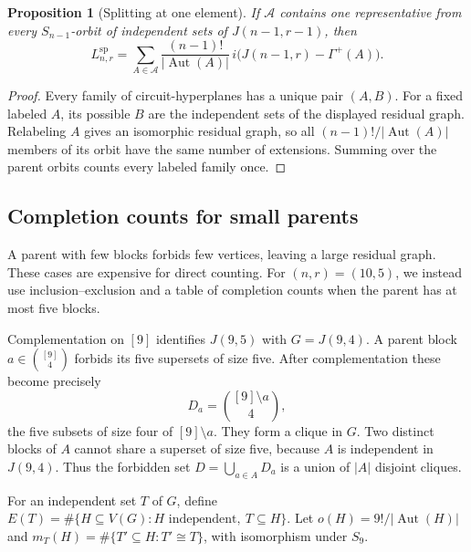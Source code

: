 \documentclass[11pt]{article}
\newtheorem{proposition}[theorem]{Proposition}
\theoremstyle{definition}
\DeclareMathOperator{\Aut}{Aut}
\newcommand{\SP}{\mathrm{sp}}
\begin{document}
\begin{proposition}[Splitting at one element]\label{prop:split}
If $\mathcal A$ contains one representative from every $S_{n-1}$-orbit
of independent sets of $J(n-1,r-1)$, then
\begin{equation}\label{eq:split}
L^{\SP}_{n,r}=\sum_{A\in\mathcal A}
       \frac{(n-1)!}{|\Aut(A)|}\,
       i\bigl(J(n-1,r)-\Gamma^+(A)\bigr).
\end{equation}
\end{proposition}
\begin{proof}
Every family of circuit-hyperplanes has a unique pair $(A,B)$. For a fixed
labeled $A$, its possible $B$ are the independent sets of the displayed
residual graph. Relabeling $A$ gives an isomorphic residual graph, so all
$(n-1)!/|\Aut(A)|$ members of its orbit have the same number of extensions.
Summing over the parent orbits counts every labeled family once.
\end{proof}

\subsection{Completion counts for small parents}

A parent with few blocks forbids few vertices, leaving a large residual
graph. These cases are expensive for direct counting. For $(n,r)=(10,5)$,
we instead use inclusion--exclusion and a table of completion counts when
the parent has at most five blocks.

Complementation on $[9]$ identifies $J(9,5)$ with $G=J(9,4)$. A parent
block $a\in\binom{[9]}4$ forbids its five supersets of size five.
After complementation these become precisely
\[
D_a=\binom{[9]\setminus a}{4},
\]
the five subsets of size four of $[9]\setminus a$. They form a clique in
$G$. Two distinct blocks of $A$ cannot share a superset of size five,
because $A$ is independent in $J(9,4)$. Thus the forbidden set
$D=\bigcup_{a\in A}D_a$ is a union of $|A|$ disjoint cliques.

For an independent set $T$ of $G$, define
$E(T)=\#\{H\subseteq V(G):H\text{ independent},\ T\subseteq H\}$.
Let $o(H)=9!/|\Aut(H)|$ and
$m_T(H)=\#\{T'\subseteq H:T'\cong T\}$, with isomorphism under $S_9$.
\end{document}
